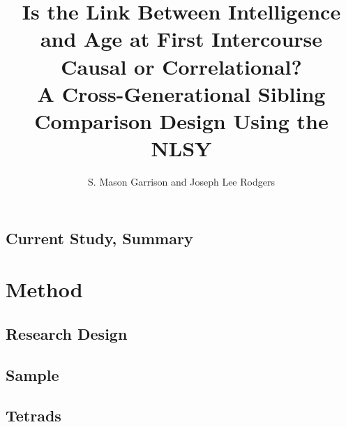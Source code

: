 \documentclass[a4paper,man,apacite,natbib,12pt,longtable,mask]{apa6}\usepackage[]{graphicx}\usepackage[]{color}
\title{Is the Link Between Intelligence and Age at First Intercourse Causal or Correlational? \\ A Cross-Generational Sibling Comparison Design Using the NLSY}
\author{S. Mason Garrison and Joseph Lee Rodgers}
\affiliation{Vanderbilt University}
\begin{document}
\maketitle

%











\section{ }\vspace{-.8cm}

\subsection{Current Study, Summary}


\section{Method}
\subsection{Research Design}

%
\subsection{Sample}

%
\subsection{Tetrads}

%
\end{document}
